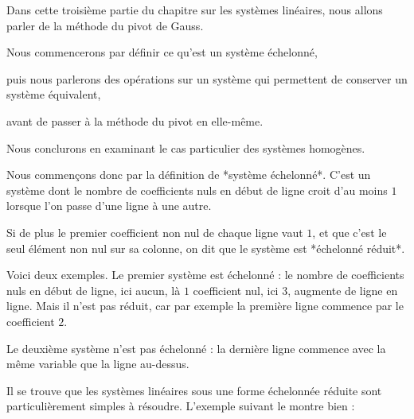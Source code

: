 







\debuttexte


\diapo

\change


Dans cette troisième  partie du chapitre sur les systèmes linéaires, nous allons parler de la méthode du pivot de Gauss.


\change

Nous commencerons par définir ce qu'est un système échelonné,

\change

puis nous parlerons des opérations sur un système qui permettent de conserver un système équivalent,

\change

avant de passer à la méthode du pivot en elle-même.

\change

Nous conclurons en examinant le cas particulier des systèmes homogènes.

\diapo

Nous commençons donc par la définition de *système échelonné*. 
C'est un système dont le nombre de coefficients nuls en début de ligne croit 
d'au moins $1$ lorsque l'on passe d'une ligne à une autre.

\change

Si de plus le premier coefficient non nul de chaque ligne vaut $1$, 
et que c'est le seul élément non nul sur sa colonne, on dit que le système est *échelonné réduit*.

\change

Voici deux exemples.
Le premier système est échelonné : le nombre de coefficients nuls en début de ligne, ici
aucun, là $1$ coefficient nul, ici $3$, augmente de ligne en ligne. 
Mais il n'est pas réduit, car par exemple la première ligne commence par le coefficient $2$.

\change


Le deuxième système n'est pas échelonné : la dernière ligne commence 
avec la même variable que la ligne au-dessus.


\diapo
Il se trouve que les systèmes linéaires sous une forme échelonnée réduite 
sont particulièrement simples à résoudre. L'exemple suivant le montre bien :

